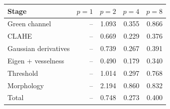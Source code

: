 \begin{tabular}{lrrrr}
\toprule
Stage & $p=1$ & $p=2$ & $p=4$ & $p=8$ \\
\midrule
Green channel & -- & 1.093 & 0.355 & 0.866 \\
CLAHE & -- & 0.669 & 0.229 & 0.376 \\
Gaussian derivatives & -- & 0.739 & 0.267 & 0.391 \\
Eigen + vesselness & -- & 0.490 & 0.179 & 0.340 \\
Threshold & -- & 1.014 & 0.297 & 0.768 \\
Morphology & -- & 2.194 & 0.860 & 0.832 \\
Total & -- & 0.748 & 0.273 & 0.400 \\
\bottomrule
\end{tabular}
